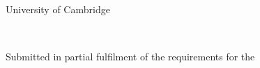 \begin{titlepage}
  \vspace*{3cm}
  \makeatletter
  \begin{center}
    \begin{Huge}
      \textbf{\textsc{\@title}}
    \end{Huge}\\[0.5cm]
    \begin{Large}
      \textsc{\@subtitle}
    \end{Large}\\[3cm]
    \begin{Huge}
      \@author        
    \end{Huge}\\[1.5cm]
    \begin{Large}
      \college{}   
    \end{Large}\\[0.2cm]
    \begin{large}
      University of Cambridge
    \end{large}\\[3cm]
    \begin{Large}
        \submissionmonthyear{}
    \end{Large}
    \vfill
    Submitted in partial fulfilment of the requirements for the  \\
    \emph{\coursethe}
  \end{center}
  \makeatother
\end{titlepage}

\newpage
